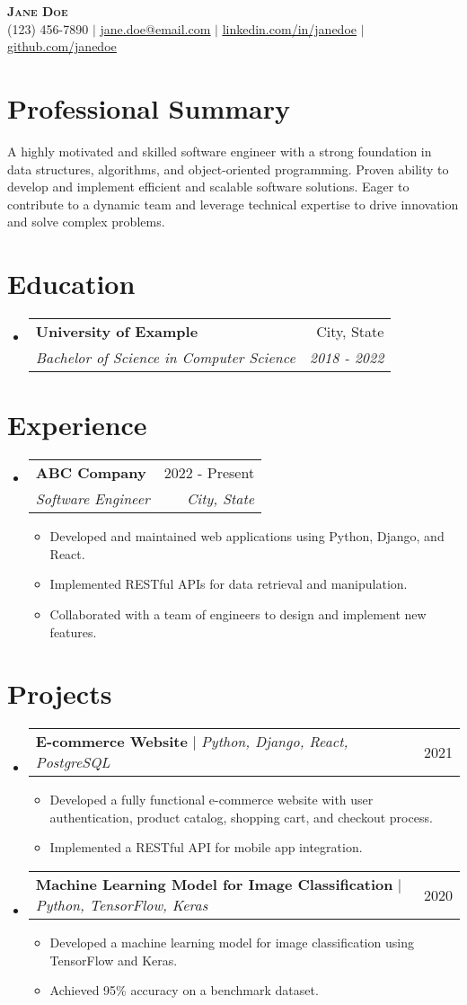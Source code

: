 \documentclass[letterpaper,11pt]{article}
\makeatletter
\newcommand{\resumeItem}[1]{
\item\small{
{#1 \vspace{-2pt}}
}
}
\newcommand{\resumeSubheading}[4]{
\vspace{-2pt}\item
\begin{tabular*}{0.97\textwidth}[t]{l@{\extracolsep{\fill}}r}
\textbf{#1} & #2 \\
\textit{\small#3} & \textit{\small #4} \\
\end{tabular*}\vspace{-7pt}
}
\newcommand{\resumeProjectHeading}[2]{
\item
\begin{tabular*}{0.97\textwidth}{l@{\extracolsep{\fill}}r}
\small#1 & #2 \\
\end{tabular*}\vspace{-7pt}
}
\newcommand{\resumeSubHeadingListStart}{\begin{itemize}[leftmargin=0.15in, label={}]}
\newcommand{\resumeSubHeadingListEnd}{\end{itemize}}
\newcommand{\resumeItemListStart}{\begin{itemize}}
\newcommand{\resumeItemListEnd}{\end{itemize}\vspace{-5pt}}
\makeatother
\begin{document}
\begin{center}
\textbf{\Huge \scshape Jane Doe} \\ \vspace{1pt}
\small (123) 456-7890 $|$ \href{mailto:jane.doe@email.com}{\underline{jane.doe@email.com}} $|$
\href{https://linkedin.com/in/janedoe}{\underline{linkedin.com/in/janedoe}} $|$
\href{https://github.com/janedoe}{\underline{github.com/janedoe}}
\end{center}


\section{Professional Summary} %
A highly motivated and skilled software engineer with a strong foundation in data structures, algorithms, and object-oriented programming. Proven ability to develop and implement efficient and scalable software solutions. Eager to contribute to a dynamic team and leverage technical expertise to drive innovation and solve complex problems.

\section{Education}
\resumeSubHeadingListStart
\resumeSubheading{University of Example}{City, State}{Bachelor of Science in Computer Science}{2018 - 2022}
\resumeSubHeadingListEnd

\section{Experience}
\resumeSubHeadingListStart
\resumeSubheading{ABC Company}{2022 - Present}{Software Engineer}{City, State}
\resumeItemListStart
\resumeItem{Developed and maintained web applications using Python, Django, and React.}
\resumeItem{Implemented RESTful APIs for data retrieval and manipulation.}
\resumeItem{Collaborated with a team of engineers to design and implement new features.}
\resumeItemListEnd
\resumeSubHeadingListEnd

\section{Projects}
\resumeSubHeadingListStart
\resumeProjectHeading{\textbf{E-commerce Website} $|$ \emph{Python, Django, React, PostgreSQL}}{2021}
\resumeItemListStart
\resumeItem{Developed a fully functional e-commerce website with user authentication, product catalog, shopping cart, and checkout process.}
\resumeItem{Implemented a RESTful API for mobile app integration.}
\resumeItemListEnd
\resumeProjectHeading{\textbf{Machine Learning Model for Image Classification} $|$ \emph{Python, TensorFlow, Keras}}{2020}
\resumeItemListStart
\resumeItem{Developed a machine learning model for image classification using TensorFlow and Keras.}
\resumeItem{Achieved 95\% accuracy on a benchmark dataset.}
\resumeItemListEnd
\resumeSubHeadingListEnd
\end{document}
